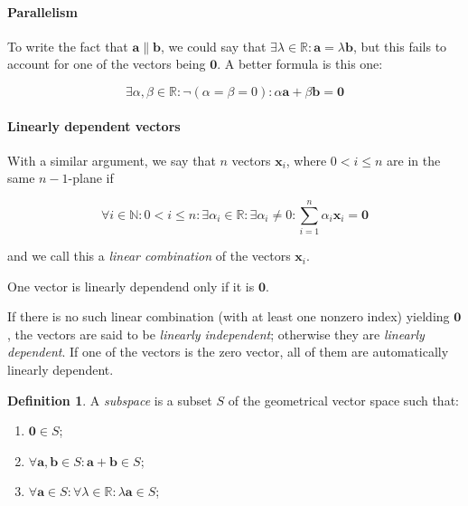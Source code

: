 \documentclass[12pt,a4paper]{report}
\numberwithin{equation}{section}
\theoremstyle{definition}
\newtheorem{definition}{Definition}[section]
\theoremstyle{remark}
\begin{document}
\paragraph{Parallelism}

To write the fact that $\mathbf{a} \parallel \mathbf{b}$, we could say that $\exists \lambda \in \mathbb{R}: \mathbf{a} = \lambda \mathbf{b}$, but this fails to account for one of the vectors being $\mathbf{0}$. A better formula is this one:

\begin{equation}
\exists \alpha , \beta \in \mathbb{R} : \neg (\alpha = \beta = 0 ):  \alpha \mathbf{a} + \beta \mathbf{b} = \mathbf{0}
\end{equation}

\paragraph{Linearly dependent vectors}

With a similar argument, we say that $n$ vectors $\mathbf{x}_i$, where $0<i\leq n$ are in the same $n-1$-plane if

\begin{equation}
\forall i \in \mathbb{N}: 0<i\leq n : \exists \alpha_i \in \mathbb{R}: \exists \alpha_i \neq 0 : \sum_{i=1}^n \alpha_i \mathbf{x}_i = \mathbf{0}
\end{equation}

and we call this a \emph{linear combination} of the vectors $\mathbf{x}_i$.

One vector is linearly dependend only if it is $\mathbf{0}$.

If there is no such linear combination (with at least one nonzero index) yielding $\mathbf{0}$, the vectors are said to be \emph{linearly independent}; otherwise they are \emph{linearly dependent}.
If one of the vectors is the zero vector, all of them are automatically linearly dependent.

\begin{definition}
A \emph{subspace} is a subset $S$ of the geometrical vector space such that:
\begin{enumerate}
\item $\mathbf{0} \in S$;
\item $\forall \mathbf{a}, \mathbf{b} \in S: \mathbf{a} + \mathbf{b} \in S $;
\item $\forall \mathbf{a} \in S: \forall \lambda \in \mathbb{R}: \lambda \mathbf{a} \in S$;
\end{enumerate}
\end{definition}
\end{document}
